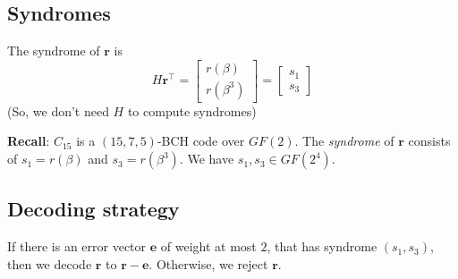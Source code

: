 \subsection*{Syndromes}
The syndrome of $ \symbf{r} $ is
\[ H\symbf{r}^\top=
    \begin{bmatrix}
        r(\beta) \\
        r(\beta^3)
    \end{bmatrix}=
    \begin{bmatrix}
        s_1 \\
        s_3
    \end{bmatrix} \]
(So, we don't need $ H $ to compute syndromes)

\textbf{Recall}: $ C_{15} $ is a $ (15,7,5) $-BCH code over $ GF(2) $.
The \emph{syndrome} of $ \symbf{r} $ consists of $ s_1=r(\beta) $
and $ s_3=r(\beta^3) $. We have $ s_1,s_3\in GF(2^4) $.

\subsection*{Decoding strategy}
If there is an error vector $ \symbf{e} $
of weight at most $ 2 $, that has syndrome $ (s_1,s_3) $, then we decode
$ \symbf{r} $ to $ \symbf{r}-\symbf{e} $. Otherwise, we reject $ \symbf{r} $.

